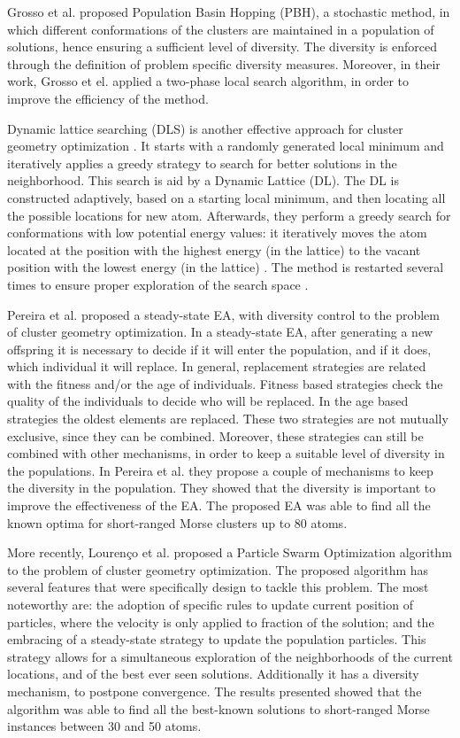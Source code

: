 		Grosso et al. \cite{grosso07} proposed Population Basin Hopping (PBH), a stochastic method, in which different conformations of the clusters are maintained in a population of solutions, hence ensuring a sufficient level of diversity. The diversity is enforced through the definition of problem specific diversity measures. Moreover, in their work, Grosso et el. applied a two-phase local search algorithm, in order to improve the efficiency of the method.
		
		Dynamic lattice searching (DLS) is another effective approach for cluster geometry optimization \cite{cheng07}. It starts with a randomly generated local minimum and iteratively applies a greedy strategy to search for better solutions in the neighborhood. This search is aid by a Dynamic Lattice (DL). The DL is constructed adaptively, based on a starting local minimum, and then locating all the possible locations for new atom. Afterwards, they perform a greedy search for conformations with low potential energy values: it iteratively moves the atom located at the position with the highest energy (in the lattice) to the vacant position with the lowest energy (in the lattice) \cite{cheng07, shao04}. The method is restarted several times to ensure proper exploration of the search space \cite{cheng07}.
			
		Pereira et al.\cite{xico09} proposed a steady-state EA, with diversity control to the problem of cluster geometry optimization. In a steady-state EA, after generating a new offspring it is necessary to decide if it will enter the population, and if it does, which individual it will replace. In general, replacement strategies are related with the fitness and/or the age of individuals. Fitness based strategies check the quality of the individuals to decide who will be replaced. In the age based strategies the oldest elements are replaced. These two strategies are not mutually exclusive, since they can be combined. Moreover, these strategies can still be combined with other mechanisms, in order to keep a suitable level of diversity in the populations.
		In Pereira et al.\cite{xico09} they propose a couple of mechanisms to keep the diversity in the population. They showed that the diversity is important to improve the effectiveness of the EA. The proposed EA was able to find all the known optima for short-ranged Morse clusters up to 80 atoms.
		
		More recently, Lourenço et al. \cite{lourenco11} proposed a Particle Swarm Optimization algorithm to the problem of cluster geometry optimization. The proposed algorithm has several features that were specifically design to tackle this problem. The most noteworthy are: the adoption of specific rules to update current position of particles, where the velocity is only applied to fraction of the solution; and the embracing of a steady-state strategy to update the population particles. This strategy allows for a simultaneous exploration of the neighborhoods of the current locations, and of the best ever seen solutions. Additionally it has a diversity mechanism, to postpone convergence.
 		The results presented showed that the algorithm was able to find all the best-known solutions to short-ranged Morse instances between 30 and 50 atoms.
		
